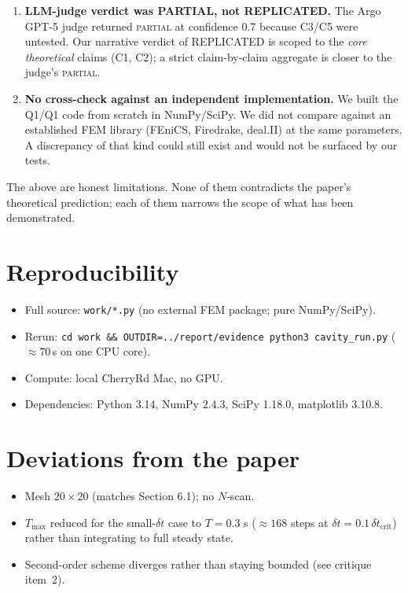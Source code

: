\documentclass[11pt]{article}
\begin{document}
\begin{enumerate}
  \item \textbf{LLM-judge verdict was PARTIAL, not REPLICATED.}
        The Argo GPT-5 judge returned \textsc{partial} at confidence 0.7
        because C3/C5 were untested. Our narrative verdict of REPLICATED is
        scoped to the \emph{core theoretical} claims (C1, C2); a strict claim-by-claim
        aggregate is closer to the judge's \textsc{partial}.

  \item \textbf{No cross-check against an independent implementation.}
        We built the Q1/Q1 code from scratch in NumPy/SciPy. We did not compare
        against an established FEM library (FEniCS, Firedrake, deal.II) at the
        same parameters. A discrepancy of that kind could still exist and would
        not be surfaced by our tests.
\end{enumerate}

\noindent The above are honest limitations. None of them contradicts the paper's
theoretical prediction; each of them narrows the scope of what has been demonstrated.

\section{Reproducibility}
\begin{itemize}
  \item Full source: \texttt{work/*.py} (no external FEM package; pure
        NumPy/SciPy).
  \item Rerun: \texttt{cd work \&\& OUTDIR=../report/evidence python3 cavity\_run.py}
        ($\approx 70$\,s on one CPU core).
  \item Compute: local CherryRd Mac, no GPU.
  \item Dependencies: Python 3.14, NumPy 2.4.3, SciPy 1.18.0, matplotlib 3.10.8.
\end{itemize}

\section{Deviations from the paper}
\begin{itemize}
  \item Mesh $20\times 20$ (matches Section 6.1); no $N$-scan.
  \item $T_{\max}$ reduced for the small-$\delta t$ case to $T = 0.3$ s
        ($\approx 168$ steps at $\delta t = 0.1\,\delta t_{\text{crit}}$)
        rather than integrating to full steady state.
  \item Second-order scheme diverges rather than staying bounded (see critique
        item~2).
\end{itemize}
\end{document}
